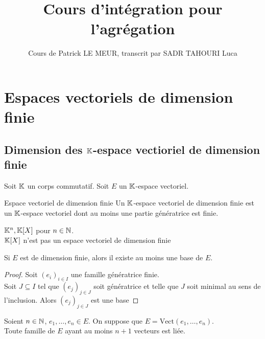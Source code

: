 \documentclass[]{report}
\title{Cours d'intégration pour l'agrégation}
\author{Cours de Patrick LE MEUR, transcrit par SADR TAHOURI Luca}
\date{}
\begin{document}
    \maketitle
    \tableofcontents

\chapter{Espaces vectoriels de dimension finie}

\section{Dimension des $\mathbb{K}$-espace vectioriel de dimension finie}

Soit $\mathbb{K}$ un corps commutatif. Soit $E$ un $\mathbb{K}$-espace vectoriel.

\begin{df}{Espace vectoriel de dimension finie}{}
    Un $\mathbb{K}$-espace vectoriel de dimension finie est un $\mathbb{K}$-espace vectoriel dont au moins une partie génératrice est finie.
\end{df}

\begin{ex}{}{}
    $\mathbb{K}^n,\mathbb{K}[X]$ pour $n\in \mathbb{N}$.\\
    $\mathbb{K}[X]$ n'est pas un espace vectoriel de dimension finie
\end{ex}

\begin{tm}{}{}
    Si $E$ est de dimension finie, alors il existe au moins une base de $E$.
\end{tm}

\begin{proof}
    Soit $(e_i)_{i\in I}$ une famille génératrice finie.\\
    Soit $J\subseteq I$ tel que $(e_j)_{j\in J}$ soit génératrice et telle que $J$ soit minimal au sens de l'inclusion. Alors $(e_j)_{j\in J}$ est une base
\end{proof}

\begin{lm}{}{}
    Soient $n\in \mathbb{N}$, $e_1,\ldots,e_n \in E$. On suppose que $E=\text{Vect}(e_1,\ldots,e_n)$.\\
    Toute famille de $E$ ayant au moins $n+1$ vecteurs est liée.
\end{lm}
\end{document}
